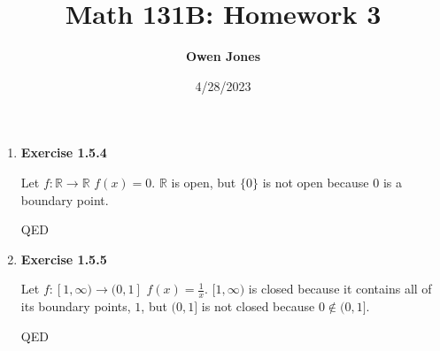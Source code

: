 \documentclass[10pt]{article}
\title{\bf Math 131B: Homework 3}
\date{4/28/2023}
\author{\bf Owen Jones}
\begin{document}
\maketitle
\begin{enumerate}[label=Problem \arabic*.]
    \item \textbf{Exercise 1.5.4}\par 
    Let $f:\mathbb{R}\rightarrow\mathbb{R}$ $f(x)=0$. $\mathbb{R}$ is open, but $\{0\}$ is not open because $0$ is a boundary point.\par 
    QED
    \item \textbf{Exercise 1.5.5}\par 
    Let $f:[1,\infty)\rightarrow(0,1]$ $f(x)=\frac{1}{x}$. $[1,\infty)$ is closed because it contains all of its boundary points, $1$, but $(0,1]$ is not closed because $0\notin(0,1]$.\par 
    QED
    

\end{enumerate}
\end{document}
